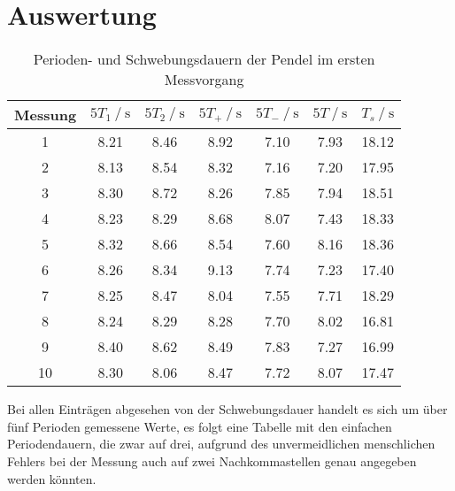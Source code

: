 \section{Auswertung}
\label{sec:Auswertung}


\begin{table}
  \centering
  \caption{Perioden- und Schwebungsdauern der Pendel im ersten Messvorgang}
  \label{tab:Messvorgang 1}
  \begin{tabular}{S[table-format=2.0] S S S S S S[table-format=2.2]}
      \toprule
      {Messung} & {$5T_1 \mathbin{/} \unit{\second}$} & {$5T_2 \mathbin{/} \unit{\second}$} 
      & {$5T_+ \mathbin{/} \unit{\second}$} & {$5T_- \mathbin{/} \unit{\second}$} & {$5T \mathbin{/} \unit{\second}$} & {$T_s \mathbin{/} \unit{\second}$} \\
       & 8.21 & 8.46 & 8.92 & 7.10 & 7.93 & 18.12\\  
       2 & 8.13 & 8.54 & 8.32 & 7.16 & 7.20 & 17.95\\ 
       3 & 8.30 & 8.72 & 8.26 & 7.85 & 7.94 & 18.51\\ 
       4 & 8.23 & 8.29 & 8.68 & 8.07 & 7.43 & 18.33\\ 
       5 & 8.32 & 8.66 & 8.54 & 7.60 & 8.16 & 18.36\\ 
       6 & 8.26 & 8.34 & 9.13 & 7.74 & 7.23 & 17.40\\ 
       7 & 8.25 & 8.47 & 8.04 & 7.55 & 7.71 & 18.29\\ 
       8 & 8.24 & 8.29 & 8.28 & 7.70 & 8.02 & 16.81\\ 
       9 & 8.40 & 8.62 & 8.49 & 7.83 & 7.27 & 16.99\\ 
      10 & 8.30 & 8.06 & 8.47 & 7.72 & 8.07 & 17.47\\ 
      \bottomrule
  \end{tabular}
\end{table}

Bei allen Einträgen abgesehen von der Schwebungsdauer handelt es sich um über fünf Perioden gemessene Werte, es folgt eine Tabelle mit den einfachen Periodendauern, die zwar auf drei,
aufgrund des unvermeidlichen menschlichen Fehlers bei der Messung auch auf zwei Nachkommastellen genau angegeben werden könnten. 
\newpage

